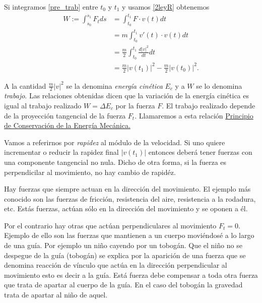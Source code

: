 Si integramos \eqref{pre_trab} entre $t_0$ y $t_1$ y usamos \eqref{2leyR} obtenemos
\begin{equation}\label{eq:trabajo}\begin{split} W:=\int_{s_0}^{s_1}F_tds&=\int_{t_0}^{t_1} F\cdot v(t)dt\\
   & =m \int_{t_0}^{t_1} v'(t)\cdot v(t)dt\\
   &=\frac{m}{2} \int_{t_0}^{t_1} \frac{d|v|^2}{dt}dt\\
   &=\frac{m}{2}|v(t_1)|^2-\frac{m}{2}|v(t_0)|^2.
\end{split}
   \end{equation}



  A la cantidad $\frac{m}{2}|v|^2$ se la denomina \emph{energía cinética} $E_c$ y a $W$ se lo denomina \emph{trabajo}.
Las relaciones obtenidas dicen que la variación de la energía cinética es igual al trabajo realizado $W=\Delta E_c$ por la fuerza $F$.
El trabajo realizado depende de la proyección tangencial de la fuerza $F_t$.  Llamaremos a esta relación
\href{https://es.wikipedia.org/wiki/Conservaci%C3%B3n_de_la_energ%C3%ADa}{Principio de Conservación de la Energía Mecánica.}

  Vamos a referirnos por \emph{rapidez} al módulo de la velocidad.
Si uno quiere incrementar o reducir la rapidez final $|v(t_1)|$ entonces deberá tener fuerzas con una componente tangencial no nula. 
Dicho de otra forma, si la fuerza es perpendicilar al movimiento, no hay cambio de rapidéz. 

  Hay fuerzas que siempre actuan en la dirección del movimiento. El ejemplo más conocido son las fuerzas de fricción, resistencia del aire,
resistencia a la rodadura, etc. Estás fuerzas, actúan sólo en la dirección del movimiento y se oponen a él.


 

  Por el contrario hay otras que actúan perpendiculares al movimiento $F_t=0$. Ejemplo de ello son las fuerzas que mantienen a un cuerpo moviéndosé a lo largo
de una guía. Por ejemplo un niño cayendo por un tobogán. Que el niño no se despegue de la guía (tobogán) se explica por la aparición de una fuerza que se denomina
reacción de vínculo que actúa en la dirección perpendicular al movimiento esto es decir a la guía. Está fuerza debe compensar a toda otra fuerza que trata de apartar
al cuerpo de la guía.  En el caso del tobogán la gravedad trata de apartar al niño de aquel.





